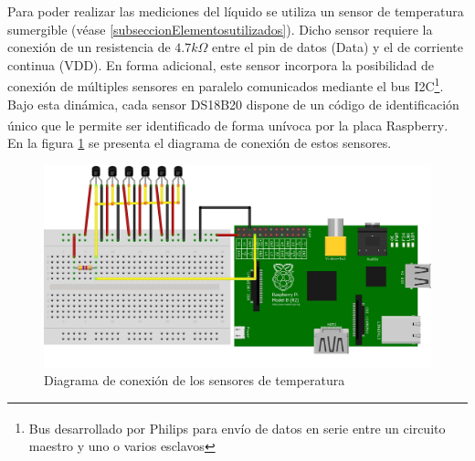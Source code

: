         \par Para poder realizar las mediciones del líquido se utiliza un sensor de temperatura sumergible (véase \ref{subseccionElementosutilizados}). Dicho sensor requiere la conexión de un resistencia de $4.7k\Omega$ entre el pin de datos (Data) y el de corriente continua (VDD). En forma adicional, este sensor incorpora la posibilidad de conexión de múltiples sensores en paralelo comunicados mediante el bus I2C\footnote{Bus desarrollado por Philips\textsuperscript{\textregistered} para envío de datos en serie entre un circuito maestro y uno o varios esclavos}. Bajo esta dinámica, cada sensor DS18B20 dispone de un código de identificación único que le permite ser identificado de forma unívoca por la placa Raspberry\textsuperscript{\textregistered}. En la figura \ref{fig:ConexionTemperatura} se presenta el diagrama de conexión de estos sensores.
        \begin{figure}
            \centering
            \includegraphics[scale = 0.8]{DiagramaSensordeTemp_bb.jpg}
            \caption{Diagrama de conexión de los sensores de temperatura}
            \label{fig:ConexionTemperatura}
        \end{figure}
        
